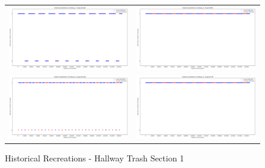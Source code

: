 \begin{figure}
  \begin{tabular}{cc}
    {\includegraphics[width = 3in]{images/results/Historical_hallway_T1_Duckett.png}} &
    {\includegraphics[width = 3in]{images/results/Historical_hallway_T1_FreMEn.png}} \\
    {\includegraphics[width = 3in]{images/results/Historical_hallway_T1_Gaussian.png}} &
    {\includegraphics[width = 3in]{images/results/Historical_hallway_T1_HyT-EM.png}} \\
  \end{tabular}
  \caption{Historical Recreations - Hallway Trash Section 1}
\end{figure}

